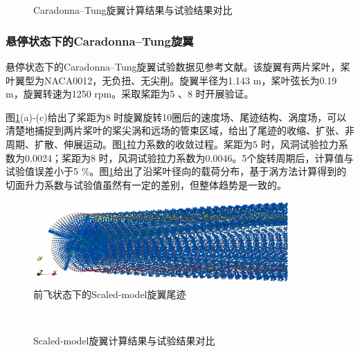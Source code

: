 \begin{figure}[!htb]  
  \quad
  \quad
  \quad\\
    \quad
      \\
      \caption{Caradonna–Tung旋翼计算结果与试验结果对比}
      \label{fig:chap2_5_3_1_2}
\end{figure}

\subsubsection{悬停状态下的Caradonna–Tung旋翼}
悬停状态下的Caradonna–Tung旋翼试验数据见参考文献\cite{caradonna1981experimental}。该旋翼有两片桨叶，桨叶翼型为NACA0012，无负扭、无尖削。旋翼半径为1.143 m，桨叶弦长为0.19 m，旋翼转速为1250 rpm。采取桨距为5 \degree 、8 \degree 时开展验证。

图\ref{fig:chap2_5_3_1_2}(a)-(c)给出了桨距为8 \degree 时旋翼旋转10圈后的速度场、尾迹结构、涡度场，可以清楚地捕捉到两片桨叶的桨尖涡和远场的管束区域，给出了尾迹的收缩、扩张、非周期、扩散、伸展运动。图\ref{fig:chap2_5_3_1_2}拉力系数的收敛过程。桨距为5 \degree 时，风洞试验拉力系数为0.0024；桨距为8 \degree 时，风洞试验拉力系数为0.0046。5个旋转周期后，计算值与试验值误差小于5 \%。图\ref{fig:chap2_5_3_1_2}给出了沿桨叶径向的载荷分布，基于涡方法计算得到的切面升力系数与试验值虽然有一定的差别，但整体趋势是一致的。

\begin{figure}[!htb]
  \centering
  \includegraphics[width=10cm]{fig/figure_chap2/chap_2_5_3_2_1.png}
  \caption{前飞状态下的Scaled-model旋翼尾迹}
  \label{fig:chap2_5_3_2_1}
\end{figure}

\begin{figure}[!htb]  
  \quad
    \\
    \caption{Scaled-model旋翼计算结果与试验结果对比}
    \label{fig:chap2_5_3_2_2}
\end{figure}

